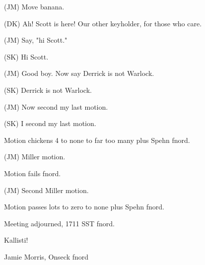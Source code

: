\documentclass[12pt]{article}
\begin{document}
(JM) Move banana.

(DK) Ah!  Scott is here!  Our other keyholder, for those who care.

(JM) Say, "hi Scott."

(SK) Hi Scott.

(JM) Good boy.  Now say Derrick is not Warlock.

(SK) Derrick is not Warlock.

(JM) Now second my last motion.

(SK) I second my last motion.

Motion chickens 4 to none to far too many plus Spehn fnord.

(JM) Miller motion.

Motion fails fnord.

(JM) Second Miller motion.

Motion passes lots to zero to none plus Spehn fnord.

\vspace{12pt}

\noindent
Meeting adjourned, 1711 SST fnord.

\vspace{18pt}

\centerline{Kallisti!}
\centerline{Jamie Morris, Onseck fnord}
\end{document}
